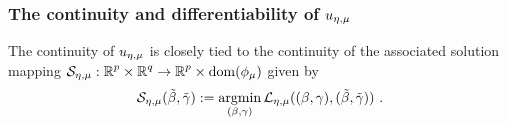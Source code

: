 

\subsubsection{The continuity and differentiability of \texorpdfstring{$\uemu$}{}}

The continuity of $\uemu$ is closely tied to the continuity of 
the associated solution mapping
$\map{\SS_\emu}{\Rp\times\Rq}{\Rp\times\dom(\phimu)}$ given by 
\begin{equation}\label{eq:argmin for u}
\SS_\emu(\tbeta,\tgam):= 
\argmin_{(\beta,\gam) } \LL_{\emu}(\bg,\tbg)\ .
\end{equation}

